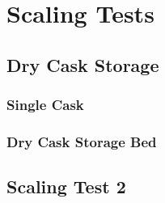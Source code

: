 \chapter{Scaling Tests}

\section{Dry Cask Storage}
\subsection{Single Cask}
\subsection{Dry Cask Storage Bed}
\section{Scaling Test 2}

